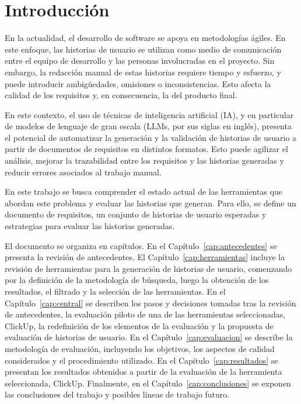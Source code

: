 \chapter{Introducción}

En la actualidad, el desarrollo de software se apoya en metodologías ágiles. En este enfoque, las historias de usuario se utilizan como medio de comunicación entre el equipo de desarrollo y las personas involucradas en el proyecto. Sin embargo, la redacción manual de estas historias requiere tiempo y esfuerzo, y puede introducir ambigüedades, omisiones o inconsistencias. Esto afecta la calidad de los requisitos y, en consecuencia, la del producto final.

En este contexto, el uso de técnicas de inteligencia artificial (IA), y en particular de modelos de lenguaje de gran escala (LLMs, por sus siglas en inglés), presenta el potencial de automatizar la generación y la validación de historias de usuario a partir de documentos de requisitos en distintos formatos. Esto puede agilizar el análisis, mejorar la trazabilidad entre los requisitos y las historias generadas y reducir errores asociados al trabajo manual. %

En este trabajo se busca comprender el estado actual de las herramientas que abordan este problema y evaluar las historias que generan. Para ello, se define un documento de requisitos, un conjunto de historias de usuario esperadas y estrategias para evaluar las historias generadas.

El documento se organiza en capítulos. En el Capítulo~\ref{cap:antecedentes} se presenta la revisión de antecedentes. El Capítulo~\ref{cap:herramientas} incluye la revisión de herramientas para la generación de historias de usuario, comenzando por la definición de la metodología de búsqueda, luego la obtención de los resultados, el filtrado y la selección de las herramientas. En el Capítulo~\ref{cap:central} se describen los pasos y decisiones tomadas tras la revisión de antecedentes, la evaluación piloto de una de las herramientas seleccionadas, ClickUp, la redefinición de los elementos de la evaluación y la propuesta de evaluación de historias de usuario. En el Capítulo~\ref{cap:evaluacion} se describe la metodología de evaluación, incluyendo los objetivos, los aspectos de calidad considerados y el procedimiento utilizado. En el Capítulo~\ref{cap:resultados} se presentan los resultados obtenidos a partir de la evaluación de la herramienta seleccionada, ClickUp. Finalmente, en el Capítulo~\ref{cap:conclusiones} se exponen las conclusiones del trabajo y posibles líneas de trabajo futuro.
